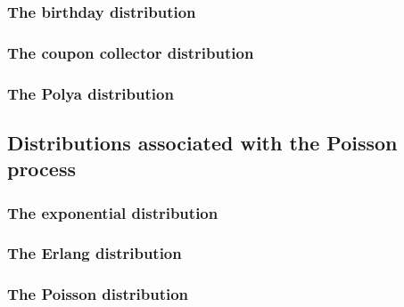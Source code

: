 \subsubsection{The birthday distribution}

\subsubsection{The coupon collector distribution}

\subsubsection{The Polya distribution}

\subsection{Distributions associated with the Poisson process}

\subsubsection{The exponential distribution}

\subsubsection{The Erlang distribution}

\subsubsection{The Poisson distribution}
